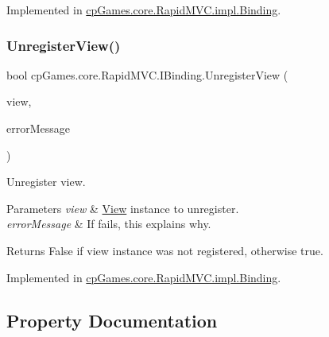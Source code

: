 Implemented in \mbox{\hyperlink{classcp_games_1_1core_1_1_rapid_m_v_c_1_1impl_1_1_binding_a3cfd038fdadb7a25cd3e37413c083049}{cp\+Games.\+core.\+Rapid\+M\+V\+C.\+impl.\+Binding}}.

\mbox{\label{interfacecp_games_1_1core_1_1_rapid_m_v_c_1_1_i_binding_ab36c868f3a9163935a650c30663f7a97}} 
\subsubsection{\texorpdfstring{UnregisterView()}{UnregisterView()}}
{\footnotesize\ttfamily bool cp\+Games.\+core.\+Rapid\+M\+V\+C.\+I\+Binding.\+Unregister\+View (\begin{DoxyParamCaption}\item[{\mbox{\hyperlink{interfacecp_games_1_1core_1_1_rapid_m_v_c_1_1_i_view}{I\+View}}}]{view,  }\item[{out string}]{error\+Message }\end{DoxyParamCaption})}



Unregister view. 


\begin{DoxyParams}{Parameters}
{\em view} & \mbox{\hyperlink{classcp_games_1_1core_1_1_rapid_m_v_c_1_1_view}{View}} instance to unregister.\\
\hline
{\em error\+Message} & If fails, this explains why.\\
\hline
\end{DoxyParams}
\begin{DoxyReturn}{Returns}
False if view instance was not registered, otherwise true.
\end{DoxyReturn}


Implemented in \mbox{\hyperlink{classcp_games_1_1core_1_1_rapid_m_v_c_1_1impl_1_1_binding_ad7209adda2ba56a242f1016c877d0883}{cp\+Games.\+core.\+Rapid\+M\+V\+C.\+impl.\+Binding}}.



\subsection{Property Documentation}
\mbox{\label{interfacecp_games_1_1core_1_1_rapid_m_v_c_1_1_i_binding_ad4ea0596cb7a0ef820717785e1e5a4ef}} 
